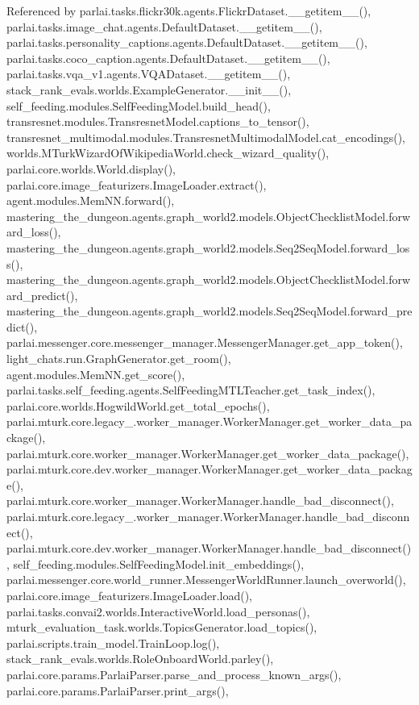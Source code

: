 Referenced by parlai.\+tasks.\+flickr30k.\+agents.\+Flickr\+Dataset.\+\_\+\+\_\+getitem\+\_\+\+\_\+(), parlai.\+tasks.\+image\+\_\+chat.\+agents.\+Default\+Dataset.\+\_\+\+\_\+getitem\+\_\+\+\_\+(), parlai.\+tasks.\+personality\+\_\+captions.\+agents.\+Default\+Dataset.\+\_\+\+\_\+getitem\+\_\+\+\_\+(), parlai.\+tasks.\+coco\+\_\+caption.\+agents.\+Default\+Dataset.\+\_\+\+\_\+getitem\+\_\+\+\_\+(), parlai.\+tasks.\+vqa\+\_\+v1.\+agents.\+V\+Q\+A\+Dataset.\+\_\+\+\_\+getitem\+\_\+\+\_\+(), stack\+\_\+rank\+\_\+evals.\+worlds.\+Example\+Generator.\+\_\+\+\_\+init\+\_\+\+\_\+(), self\+\_\+feeding.\+modules.\+Self\+Feeding\+Model.\+build\+\_\+head(), transresnet.\+modules.\+Transresnet\+Model.\+captions\+\_\+to\+\_\+tensor(), transresnet\+\_\+multimodal.\+modules.\+Transresnet\+Multimodal\+Model.\+cat\+\_\+encodings(), worlds.\+M\+Turk\+Wizard\+Of\+Wikipedia\+World.\+check\+\_\+wizard\+\_\+quality(), parlai.\+core.\+worlds.\+World.\+display(), parlai.\+core.\+image\+\_\+featurizers.\+Image\+Loader.\+extract(), agent.\+modules.\+Mem\+N\+N.\+forward(), mastering\+\_\+the\+\_\+dungeon.\+agents.\+graph\+\_\+world2.\+models.\+Object\+Checklist\+Model.\+forward\+\_\+loss(), mastering\+\_\+the\+\_\+dungeon.\+agents.\+graph\+\_\+world2.\+models.\+Seq2\+Seq\+Model.\+forward\+\_\+loss(), mastering\+\_\+the\+\_\+dungeon.\+agents.\+graph\+\_\+world2.\+models.\+Object\+Checklist\+Model.\+forward\+\_\+predict(), mastering\+\_\+the\+\_\+dungeon.\+agents.\+graph\+\_\+world2.\+models.\+Seq2\+Seq\+Model.\+forward\+\_\+predict(), parlai.\+messenger.\+core.\+messenger\+\_\+manager.\+Messenger\+Manager.\+get\+\_\+app\+\_\+token(), light\+\_\+chats.\+run.\+Graph\+Generator.\+get\+\_\+room(), agent.\+modules.\+Mem\+N\+N.\+get\+\_\+score(), parlai.\+tasks.\+self\+\_\+feeding.\+agents.\+Self\+Feeding\+M\+T\+L\+Teacher.\+get\+\_\+task\+\_\+index(), parlai.\+core.\+worlds.\+Hogwild\+World.\+get\+\_\+total\+\_\+epochs(), parlai.\+mturk.\+core.\+legacy\+\_.\+worker\+\_\+manager.\+Worker\+Manager.\+get\+\_\+worker\+\_\+data\+\_\+package(), parlai.\+mturk.\+core.\+worker\+\_\+manager.\+Worker\+Manager.\+get\+\_\+worker\+\_\+data\+\_\+package(), parlai.\+mturk.\+core.\+dev.\+worker\+\_\+manager.\+Worker\+Manager.\+get\+\_\+worker\+\_\+data\+\_\+package(), parlai.\+mturk.\+core.\+worker\+\_\+manager.\+Worker\+Manager.\+handle\+\_\+bad\+\_\+disconnect(), parlai.\+mturk.\+core.\+legacy\+\_.\+worker\+\_\+manager.\+Worker\+Manager.\+handle\+\_\+bad\+\_\+disconnect(), parlai.\+mturk.\+core.\+dev.\+worker\+\_\+manager.\+Worker\+Manager.\+handle\+\_\+bad\+\_\+disconnect(), self\+\_\+feeding.\+modules.\+Self\+Feeding\+Model.\+init\+\_\+embeddings(), parlai.\+messenger.\+core.\+world\+\_\+runner.\+Messenger\+World\+Runner.\+launch\+\_\+overworld(), parlai.\+core.\+image\+\_\+featurizers.\+Image\+Loader.\+load(), parlai.\+tasks.\+convai2.\+worlds.\+Interactive\+World.\+load\+\_\+personas(), mturk\+\_\+evaluation\+\_\+task.\+worlds.\+Topics\+Generator.\+load\+\_\+topics(), parlai.\+scripts.\+train\+\_\+model.\+Train\+Loop.\+log(), stack\+\_\+rank\+\_\+evals.\+worlds.\+Role\+Onboard\+World.\+parley(), parlai.\+core.\+params.\+Parlai\+Parser.\+parse\+\_\+and\+\_\+process\+\_\+known\+\_\+args(), parlai.\+core.\+params.\+Parlai\+Parser.\+print\+\_\+args(), 